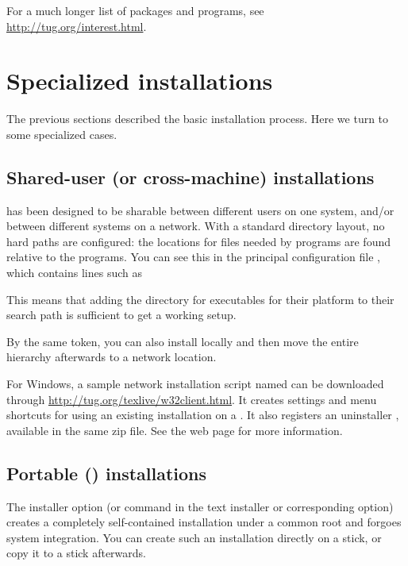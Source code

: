 \documentclass{article}
\begin{document}
For a much longer list of packages and programs, see
\url{http://tug.org/interest.html}.


\section{Specialized installations}

The previous sections described the basic installation process.  Here we
turn to some specialized cases.

\subsection{Shared-user (or cross-machine) installations}
\label{sec:sharedinstall}

\TL{} has been designed to be sharable between different users on one
system, and/or between different systems on a network. With a standard
directory layout, no hard paths are configured: the locations for files
needed by \TL{} programs are found relative to the programs.  You can
see this in the principal configuration file
, which contains lines such as
This means that adding the directory for \TL{} executables for their
platform to their search path is sufficient to get a working setup.

By the same token, you can also install \TL{} locally and then move
the entire hierarchy afterwards to a network location.

For Windows, a sample network installation script named
 can be downloaded through
\url{http://tug.org/texlive/w32client.html}.  It creates settings and
menu shortcuts for using an existing \TL{} installation on a .
It also registers an uninstaller , available
in the same zip file.  See the web page for more information.


\subsection{Portable (\USB{}) installations}
\label{sec:portable-tl}

The  installer option (or  command in the text
installer or corresponding \GUI{} option) creates a completely
self-contained \TL{} installation under a common root and forgoes system
integration. You can create such an installation directly on a \USB{}
stick, or copy it to a \USB{} stick afterwards.
\end{document}
